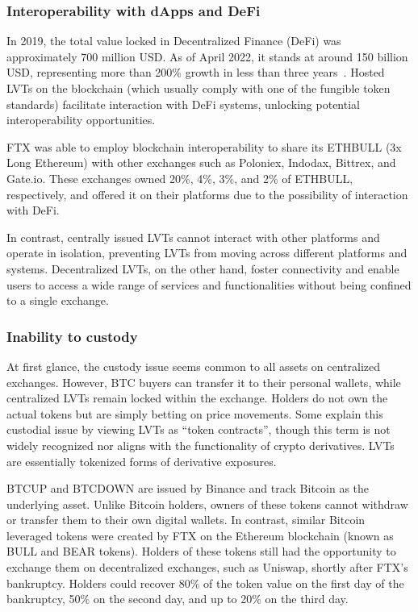 \subsubsection{Interoperability with dApps and DeFi}
In 2019, the total value locked in Decentralized Finance (DeFi) was approximately 700 million USD. As of April 2022, it stands at around 150 billion USD, representing more than 200\% growth in less than three years~\cite{werner2022sok}. Hosted LVTs on the blockchain (which usually comply with one of the fungible token standards) facilitate interaction with DeFi systems, unlocking potential interoperability opportunities. 
\begin{example}
	FTX was able to employ blockchain interoperability to share its ETHBULL (3x Long Ethereum) with other exchanges such as Poloniex, Indodax, Bittrex, and Gate.io. These exchanges owned 20\%, 4\%, 3\%, and 2\% of ETHBULL, respectively, and offered it on their platforms due to the possibility of interaction with DeFi.
\end{example}
In contrast, centrally issued LVTs cannot interact with other platforms and operate in isolation, preventing LVTs from moving across different platforms and systems. Decentralized LVTs, on the other hand, foster connectivity and enable users to access a wide range of services and functionalities without being confined to a single exchange.

\subsubsection{Inability to custody}
At first glance, the custody issue seems common to all assets on centralized exchanges. However, BTC buyers can transfer it to their personal wallets, while centralized LVTs remain locked within the exchange. Holders do not own the actual tokens but are simply betting on price movements. Some explain this custodial issue by viewing LVTs as ``token contracts'', though this term is not widely recognized nor aligns with the functionality of crypto derivatives. LVTs are essentially tokenized forms of derivative exposures.
\begin{example}
	BTCUP and BTCDOWN are issued by Binance and track Bitcoin as the underlying asset. Unlike Bitcoin holders, owners of these tokens cannot withdraw or transfer them to their own digital wallets. In contrast, similar Bitcoin leveraged tokens were created by FTX on the Ethereum blockchain (known as BULL and BEAR tokens). Holders of these tokens still had the opportunity to exchange them on decentralized exchanges, such as Uniswap, shortly after FTX's bankruptcy. Holders could recover 80\% of the token value on the first day of the bankruptcy, 50\% on the second day, and up to 20\% on the third day.
\end{example}

